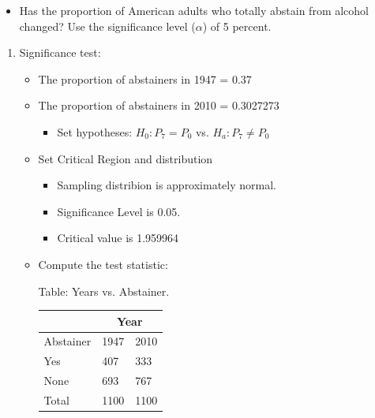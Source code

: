 \documentclass[11pt, chapterprefix=true]{scrbook}\usepackage[]{graphicx}\usepackage[]{color}
\begin{document}
\begin{exercises}
\begin{exercise}
\begin{itemize}
\item Has the proportion of American adults who totally abstain from alcohol \\ changed?  Use the significance level ($\alpha$) of 5 percent.
\end{itemize}

  \vspace{5mm}

\end{exercise}
\vspace{2mm}
\begin{solution}

  	  \begin{enumerate}
	 \item Significance test:


\begin{itemize}
\item The proportion of abstainers in 1947 = 0.37
\item The proportion of abstainers in 2010 = 0.3027273
  \begin{itemize}
  \item Set hypotheses: $H_0: P_7 = P_0$ vs. $H_a: P_7 \ne P_0$
  \end{itemize}

\item Set Critical Region and distribution

  \begin{itemize}
  \item Sampling distribion is approximately normal.
  \item Significance Level is 0.05.
  \item Critical value is 1.959964
  \end{itemize}

\item Compute the test statistic:

\begin{minipage}[h]{6cm}

Table: Years vs. Abstainer.



      \begin{tabular}{@{} p{2.5cm} p{1cm} p{1cm} @{}} \hline %
     &  \multicolumn{2}{c}{Year } \\ \hline
     Abstainer   & 1947 & 2010 \\ \hline
     Yes   & 407 & 333 \\
     None          & 693 & 767 \\ \hline
     Total        & 1100 & 1100 \\ \hline
   \end{tabular}


\end{minipage}
\end{itemize}
\end{enumerate}
\end{solution}
\end{exercises}
\end{document}

